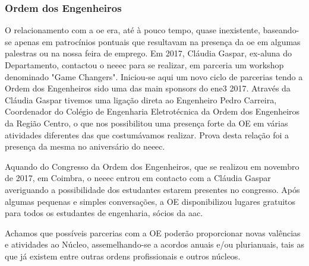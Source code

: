 
\subsubsection{Ordem dos Engenheiros}

O relacionamento com a \acrfull{oe} era, até à pouco tempo, quase inexistente, baseando-se apenas em patrocínios pontuais que resultavam na presença da \acrshort{oe} em algumas palestras ou na nossa feira de emprego. Em 2017, Cláudia Gaspar, ex-aluna do Departamento, contactou o \acrshort{neeec} para se realizar, em parceria um workshop denominado "Game Changers". Iniciou-se aqui um novo ciclo de parcerias tendo a Ordem dos Engenheiros sido uma das main sponsors do \acrshort{ene3} 2017. Através da Cláudia Gaspar tivemos uma ligação direta ao Engenheiro Pedro Carreira, Coordenador do Colégio de Engenharia Eletrotécnica da Ordem dos Engenheiros da Região Centro, o que nos possibilitou uma presença forte da OE em várias atividades diferentes das que costumávamos realizar. Prova desta relação foi a presença da mesma no aniversário do \acrshort{neeec}.

Aquando do Congresso da Ordem dos Engenheiros, que se realizou em novembro de 2017, em Coimbra, o \acrshort{neeec} entrou em contacto com a Cláudia Gaspar averiguando a possibilidade dos estudantes estarem presentes no congresso. Após algumas pequenas e simples conversações, a OE disponibilizou lugares gratuitos para todos os estudantes de engenharia, sócios da \acrshort{aac}.

Achamos que possíveis parcerias com a OE poderão proporcionar novas valências e atividades ao Núcleo, assemelhando-se a acordos anuais e/ou plurianuais, tais as que já existem entre outras ordens profissionais e outros núcleos.